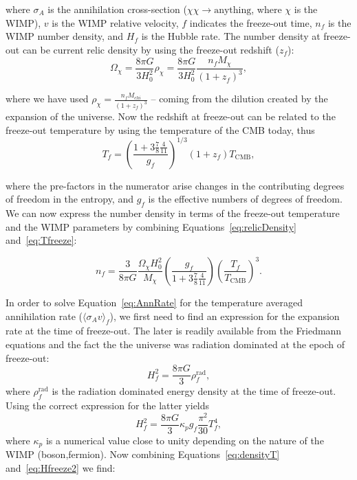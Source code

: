 where $\sigma_{A}$ is the annihilation cross-section
($\chi\chi\rightarrow \mathrm{anything}$, where $\chi$ is the WIMP),
$v$ is the WIMP relative velocity, $f$ indicates the freeze-out time,
$n_{f}$ is the WIMP number density, and $H_{f}$ is the Hubble
rate. The number density at freeze-out can be current relic density by
using the freeze-out redshift ($z_{f}$):
\begin{equation}
\label{eq:relicDensity}
\Omega_{\chi} = \frac{8\pi G}{3H^{2}_{0}}\rho_{\chi} = \frac{8\pi G}{3H^{2}_{0}}\frac{n_{f}M_{\chi}}{(1+z_{f})^{3}},
\end{equation}

where we have used $\rho_{\chi} = \frac{n_{f}M_{chi}}{(1+z_{f})^{3}}$
-- coming from the dilution created by the expansion of the
universe. Now the redshift at freeze-out can be related to the
freeze-out temperature by using the temperature of the CMB today, thus
\begin{equation}
\label{eq:Tfreeze}
T_{f} = \left( \frac{1+3\frac{7}{8}\frac{4}{11}}{g_{f}}\right)^{1/3} (1+z_{f})T_{\mathrm{CMB}},
\end{equation}

where the pre-factors in the numerator arise changes in the
contributing degrees of freedom in the entropy, and $g_{f}$ is the
effective numbers of degrees of freedom. We can now express the number
density in terms of the freeze-out temperature and the WIMP parameters
by combining Equations~\ref{eq:relicDensity} and~\ref{eq:Tfreeze}:

\begin{equation}
\label{eq:densityT}
n_{f} = \frac{3}{8\pi G}\frac{\Omega_{\chi}H^{2}_{0}}{M_{\chi}}\left(\frac{g_{f}}{1+3\frac{7}{8}\frac{4}{11}}\right)\left(\frac{T_{f}}{T_{\mathrm{CMB}}}\right)^{3}.
\end{equation}

In order to solve Equation~\ref{eq:AnnRate} for the temperature
averaged annihilation rate ($\langle \sigma_{A}v\rangle_{f}$), we
first need to find an expression for the expansion rate at the time of
freeze-out. The later is readily available from the Friedmann
equations and the fact the the universe was radiation dominated at the
epoch of freeze-out:
\begin{equation}
\label{eq:Hfreeze}
H^{2}_{f} = \frac{8\pi G}{3}\rho^{\mathrm{rad}}_{f},
\end{equation}
where $\rho^{\mathrm{rad}}_{f}$ is the radiation dominated energy
density at the time of freeze-out. Using the correct expression for the
latter yields
\begin{equation}
\label{eq:Hfreeze2}
H^{2}_{f} = \frac{8\pi G}{3}\kappa_{p}g_{f}\frac{\pi^{2}}{30}T^{4}_{f},
\end{equation}
where $\kappa_{p}$ is a numerical value close to unity depending on
the nature of the WIMP (boson,fermion). Now combining
Equations~\ref{eq:densityT} and~\ref{eq:Hfreeze2} we find:

